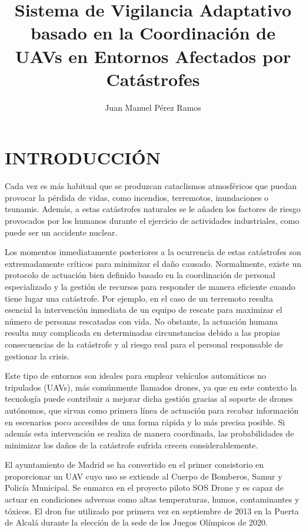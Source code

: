 \documentclass{pre-tfg}
\title{Sistema de Vigilancia Adaptativo basado en la Coordinación de UAVs en Entornos Afectados por Catástrofes}
\author{Juan Manuel Pérez Ramos}
\begin{document}
\maketitle
\tableofcontents

\newpage

\section{INTRODUCCIÓN}

Cada vez es más habitual que se produzcan cataclismos atmosféricos\cite{desastres} que puedan provocar la pérdida de vidas, como incendios, terremotos, inundaciones o tsunamis. Además, a estas catástrofes naturales se le añaden los factores de riesgo provocados por los humanos durante el ejercicio de actividades industriales\cite{desastres}, como puede ser un accidente nuclear.
  
Los momentos inmediatamente posteriores a la ocurrencia de estas catástrofes son extremadamente críticos para minimizar el daño causado. Normalmente, existe un protocolo de actuación bien definido basado en la coordinación de personal especializado y la gestión de recursos para responder de manera eficiente cuando tiene lugar una catástrofe. Por ejemplo, en el caso de un terremoto resulta esencial la intervención inmediata de un equipo de rescate para maximizar el número de personas rescatadas con vida. No obstante, la actuación humana resulta muy complicada en determinadas circunstancias debido a las propias consecuencias de la catástrofe y al riesgo real para el personal responsable de gestionar la crisis.

Este tipo de entornos son ideales para emplear vehículos automáticos no tripulados (UAVs), más comúnmente llamados drones\cite{dron1}, ya que en este contexto la tecnología puede contribuir a mejorar dicha gestión gracias al soporte de drones autónomos, que sirvan como primera línea de actuación para recabar información en escenarios poco accesibles de una forma rápida y lo más precisa posible. Si además esta intervención se realiza de manera coordinada, las probabilidades de minimizar los daños de la catástrofe sufrida crecen considerablemente.

El ayuntamiento de Madrid se ha convertido en el primer consistorio en proporcionar un UAV cuyo uso se extiende al Cuerpo de Bomberos, Samur y Policía Municipal. Se enmarca en el proyecto piloto SOS Drone\cite{sosdrone} y es capaz de actuar en condiciones adversas como altas temperaturas, humos, contaminantes y tóxicos. El dron fue utilizado por primera vez en septiembre de 2013 en la Puerta de Alcalá durante la elección de la sede de los Juegos Olímpicos de 2020.
\end{document}
